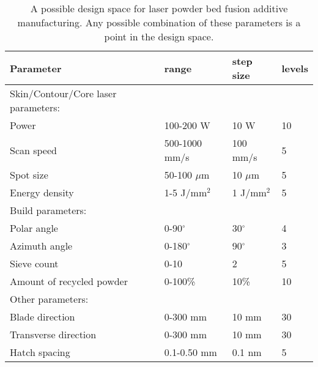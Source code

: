 \begin{table*}[t]
    \renewcommand{\arraystretch}{0.8}
    \setlength{\tabcolsep}{5pt}
    \begin{center}
        \begin{tabular}{@{}llll@{}}
            \toprule
            \hline
             Parameter & range & step size & levels \\ \midrule
            \hline
            \hline
            Skin/Contour/Core laser parameters: & & & \\
            Power & 100-200 W & 10 W & 10 \\
            Scan speed & 500-1000 mm/s & 100 mm/s & 5 \\
            Spot size & 50-100 $\mu$m & 10 $\mu$m & 5 \\
            Energy density & 1-5 J/mm$^2$ & 1 J/mm$^2$ & 5 \\
            \hline
            Build parameters: & & & \\
            Polar angle & 0-90$^\circ$ & 30$^\circ$  & 4 \\
            Azimuth angle & 0-180$^\circ$ & 90$^\circ$  & 3 \\
            Sieve count & 0-10 & 2 & 5 \\
            Amount of recycled powder & 0-100\% & 10\% & 10 \\
            \hline
            Other parameters: & & & \\
            Blade direction & 0-300 mm & 10 mm  & 30 \\
            Transverse direction & 0-300 mm & 10 mm  & 30 \\
            Hatch spacing & 0.1-0.50 mm & 0.1 nm  & 5 \\
            \hline
            \bottomrule
        \end{tabular}
        \caption{A possible design space for laser powder bed fusion additive manufacturing. Any possible combination of these parameters is a point in the design space.}
        \label{table:design_space}
    \end{center}
\end{table*}
